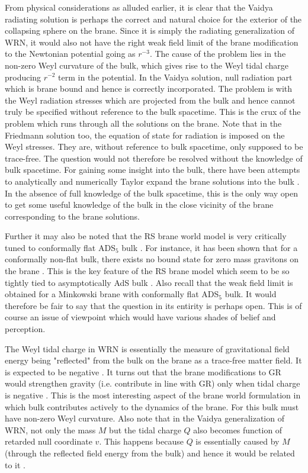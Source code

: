 \documentclass[a4paper,twocolumn,showpacs,preprintnumbers,amsmath,amssymb]{revtex4}
\begin{document}
From physical considerations as alluded earlier, it is clear that the Vaidya 
radiating solution is perhaps the correct and natural choice for the exterior 
of the collapsing sphere on the brane. Since it is simply the radiating 
generalization of WRN, it would also not have the right weak field limit of 
the brane modification to the Newtonian potential going as $r^{-3}$. The cause
 of the problem lies in the non-zero Weyl curvature of the bulk, which gives 
rise to the Weyl tidal charge producing $r^{-2}$ term in the potential. In 
the Vaidya solution, null radiation part which is brane bound and hence is 
correctly incorporated. The problem is with the Weyl radiation stresses 
which are projected from the bulk and hence cannot truly be specified without 
reference to the bulk spacetime. This is the crux of the problem which runs 
through all the solutions on the brane. Note that in the Friedmann solution 
too, the equation of state for radiation is imposed on the Weyl stresses. 
They are, without reference to bulk spacetime, only supposed to be trace-free.
 The question would not therefore be resolved without the knowledge of bulk 
spacetime. For gaining some insight into the bulk, there have been 
attempts to analytically and numerically Taylor expand the brane solutions 
into the bulk \cite{n8,n9,rsd}. In the absence of full knowledge of the bulk 
spacetime, this is the only way open to get some useful knowledge of the bulk 
in the close vicinity of the brane corresponding to the brane solutions.  

Further it may also be noted that the RS brane world model is very critically 
tuned to conformally flat ADS$_5$ bulk \cite{sd,n9}. For instance, it has 
been shown that for a conformally non-flat bulk, there exists no bound state 
for zero mass gravitons on the brane \cite{sd}. This is the key feature of 
the RS brane model which seem to be so tightly tied to asymptotically AdS bulk \cite{pn}. 
Also recall that the weak field limit is obtained for a Minkowski brane 
with conformally flat ADS$_5$ bulk. It would therefore be fair to say that 
the question in its entirity is perhaps open. This is of course an issue of 
viewpoint which would have various shades of belief and perception.

The Weyl tidal charge in WRN is essentially the measure of gravitational
field energy being "reflected" from the bulk on the brane as a trace-free
matter field. It is expected to be negative \cite{r2,r6,d}. It turns out that 
the brane modifications to GR would strengthen gravity (i.e. contribute in 
line with GR) only when tidal charge is negative \cite{d}. This is the most 
interesting aspect of the brane world formulation in which bulk contributes 
actively to the dynamics of the brane. For this bulk must have non-zero Weyl 
curvature. Also note that in the Vaidya generalization of WRN, not only the 
mass $M$ but the tidal charge $Q$ also becomes function of retarded null 
coordinate $v$. This happens because $Q$ is essentially caused by $M$ (through 
the reflected field energy from the bulk) and hence it would be related to it 
\cite{r2,r6,d}.
\end{document}
